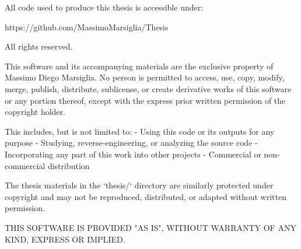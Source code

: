 
All code used to produce this thesis is accessible under:

https://github.com/MassimoMarsiglia/Thesis

All rights reserved.

This software and its accompanying materials are the exclusive property of
Massimo Diego Marsiglia. No person is permitted to access, use, copy,
modify, merge, publish, distribute, sublicense, or create derivative works
of this software or any portion thereof, except with the express prior
written permission of the copyright holder.

This includes, but is not limited to:
- Using this code or its outputs for any purpose
- Studying, reverse-engineering, or analyzing the source code
- Incorporating any part of this work into other projects
- Commercial or non-commercial distribution

The thesis materials in the `thesis/` directory are similarly protected
under copyright and may not be reproduced, distributed, or adapted without
written permission.

THIS SOFTWARE IS PROVIDED "AS IS", WITHOUT WARRANTY OF ANY KIND, EXPRESS OR
IMPLIED.
